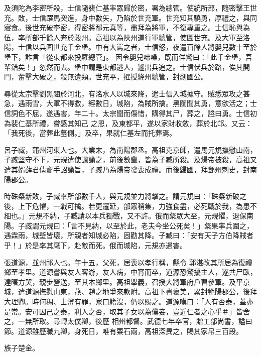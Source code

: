 \begin{pinyinscope}
 及須陀為李密所殺，士信隨裴仁基率眾歸於密，署為總管。使統所部，隨密擊王世充。敗，士信躍馬突進，身中數矢，乃陷於世充軍。世充知其驍勇，厚禮之，與同寢食。後世充破李密，得密將邴元真等，盡拜為將軍，不復專重之。士信恥與為伍，率所部千餘人奔於穀州。高祖以為陜州道行軍總管，使圖世充。及大軍至洛陽，士信以兵圍世充千金堡。中有大罵之者，士信怒，夜遣百餘人將嬰兒數十至於堡下，詐言「從東都來投羅總管」。
 因令嬰兒啼噪，既而佯驚曰：「此千金堡，吾輩錯矣！」忽然而去。堡中謂是東都逃人，遽出兵追之。士信伏兵於路，俟其開門，奮擊大破之，殺無遺類。世充平，擢授絳州總管，封剡國公。



 尋從太宗擊劉黑闥於河北，有洺水人以城來降，遣士信入城據守。賊悉眾攻之甚急，遇雨雪，大軍不得救，經數日，城陷，為賊所擒。黑闥聞其勇，意欲活之；士信詞色不屈，遂遇害，年二十。太宗聞而傷惜，購得其尸，葬之，謚曰勇。士信初為裴仁基所禮，嘗感其知己
 之恩，及東都平，遂以家財收斂，葬於北邙。又云：「我死後，當葬此墓側。」及卒，果就仁基左而托葬焉。



 呂子臧，蒲州河東人也。大業末，為南陽郡丞。高祖克京師，遣馬元規撫慰山南，子臧堅守不下，元規遣使諷諭之，前後數輩，皆為子臧所殺。及煬帝被殺，高祖又遣其婿薛君倩齎手詔諭旨，子臧乃為煬帝發喪成禮。而後歸國，拜鄧州刺史，封南陽郡公。



 時硃粲新敗，子臧率所部數千人，與元規並力將擊之。謂元規曰：「硃粲新破之
 後，上下危懼，一戰可擒。若更遷延，部眾稍集，力強食盡，必死戰於我，為患不細也。」元規不納，子臧請以本兵獨戰，又不許。俄而粲眾大至，元規懼，退保南陽。子臧謂元規曰：「言不見納，以至於此，老夫今坐公死矣！」粲果率兵圍之，遇霖雨，城壁皆壞，所親者知城必陷，固勸其降。子臧曰：「安有天子方伯降賊者乎！」於是率其麾下，赴敵而死。俄而城陷，元規亦遇害。



 張道源，並州祁人也。年十五，父死，居喪以孝行稱，縣令
 郭湛改其所居為復禮鄉至孝里。道源嘗與友人客游，友人病，中宵而卒，道源恐驚擾主人，遂共尸臥，達曙方哭，親步營送，至其本鄉里。高祖舉義，召授大將軍府戶曹參軍。及平京城，遣道源撫慰山東，燕、趙之地爭來款附。高祖下書褒美，累封範陽郡公，後拜大理卿。時何稠、士澄有罪，家口籍沒，仍以賜之。道源嘆曰：「人有否泰，蓋亦是常。安可因己之泰，利人之否，取其子女以為僕妾，豈近仁者之心乎＃」皆舍之，一無所取。尋轉太僕卿，後歷
 相州都督。武德七年卒官，贈工部尚書，謚曰節。道源雖歷職九卿，身死日，唯有粟石兩，高祖深異之，賜其家帛三百段。



 族子楚金。




\end{pinyinscope}
